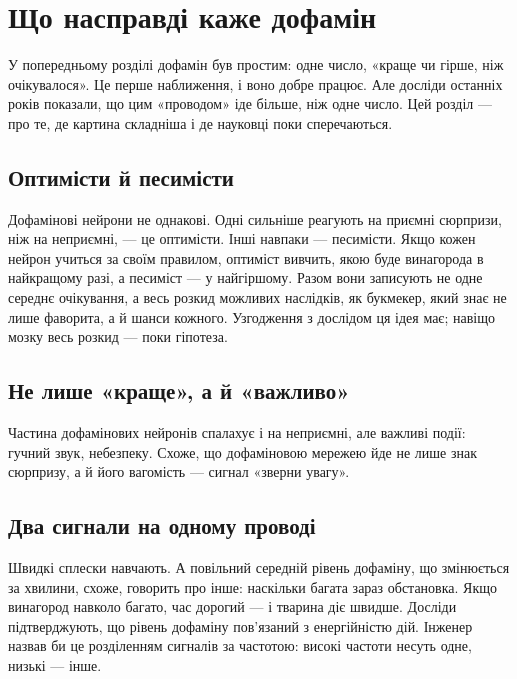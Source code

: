 \chapter{Що насправді каже дофамін}

У попередньому розділі дофамін був простим: одне число, «краще чи гірше, ніж очікувалося». Це перше наближення, і воно добре працює. Але досліди останніх років показали, що цим «проводом» іде більше, ніж одне число. Цей розділ --- про те, де картина складніша і де науковці поки сперечаються.

\section*{Оптимісти й песимісти}

Дофамінові нейрони не однакові. Одні сильніше реагують на приємні сюрпризи, ніж на неприємні, --- це оптимісти. Інші навпаки --- песимісти. Якщо кожен нейрон учиться за своїм правилом, оптиміст вивчить, якою буде винагорода в найкращому разі, а песиміст --- у найгіршому. Разом вони записують не одне середнє очікування, а весь розкид можливих наслідків, як букмекер, який знає не лише фаворита, а й шанси кожного. Узгодження з дослідом ця ідея має; навіщо мозку весь розкид --- поки гіпотеза.


\section*{Не лише «краще», а й «важливо»}

Частина дофамінових нейронів спалахує і на неприємні, але важливі події: гучний звук, небезпеку. Схоже, що дофаміновою мережею йде не лише знак сюрпризу, а й його вагомість --- сигнал «зверни увагу».

\section*{Два сигнали на одному проводі}

Швидкі сплески навчають. А повільний середній рівень дофаміну, що змінюється за хвилини, схоже, говорить про інше: наскільки багата зараз обстановка. Якщо винагород навколо багато, час дорогий --- і тварина діє швидше. Досліди підтверджують, що рівень дофаміну пов'язаний з енергійністю дій. Інженер назвав би це розділенням сигналів за частотою: високі частоти несуть одне, низькі --- інше.

